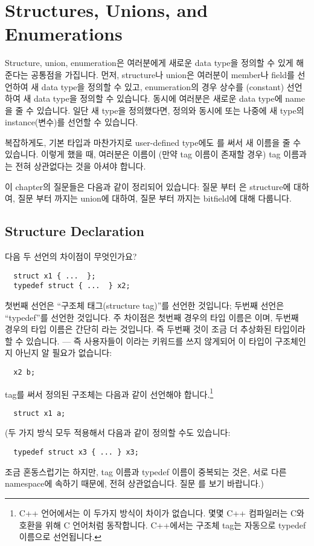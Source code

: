 \chapter{Structures, Unions, and Enumerations}	\label{chap:struct}

Structure, union, enumeration은 여러분에게 새로운 data type을 정의할 수
있게 해준다는 공통점을 가집니다.  먼저, structure나 union은 여러분이
member나 field를 선언하여 새 data type을 정의할 수 있고, enumeration의 경우
상수를 (constant) 선언하여 새 data type을 정의할 수 있습니다.
동시에 여러분은 새로운 data type에  name을 줄 수 있습니다.
일단 새 type을 정의했다면, 정의와 동시에 또는 나중에 새 type의 
instance(변수)를 선언할 수 있습니다.

복잡하게도, 기본 타입과 마찬가지로 user-defined type에도 를
써서 새 이름을 줄 수 있습니다. 이렇게 했을 때, 여러분은  이름이
(만약 tag 이름이 존재할 경우) tag 이름과는 전혀 상관없다는 것을 아셔야 
합니다.

이 chapter의 질문들은 다음과 같이 정리되어 있습니다:  
질문 부터 은
structure에 대하여, 질문 부터 까지는 union에 대하여,
질문 부터 까지는 bitfield에 대해 다룹니다.

\section{Structure Declaration}

\begin{faq}
	다음 두 선언의 차이점이 무엇인가요?

\begin{verbatim}
  struct x1 { ...  };
  typedef struct { ...  } x2;
\end{verbatim}

\A
	첫번째 선언은 ``구조체 태그(structure tag)''를 선언한 것입니다; 두번째 선언은
	``typedef''를 선언한 것입니다.  주 차이점은 첫번째 경우의 타입 이름은
	이며, 두번째 경우의 타입 이름은 간단히 라는
	것입니다.  즉 두번째 것이 조금 더 추상화된 타입이라 할 수 있습니다.
	--- 즉 사용자들이 이라는 키워드를 쓰지 않게되어 이 타입이
	구조체인지 아닌지 알 필요가 없습니다:
\begin{verbatim}
  x2 b;
\end{verbatim}
        tag를 써서 정의된 구조체는 다음과 같이 선언해야 합니다.\footnote{C++ 언어에서는
        이 두가지 방식이 차이가 없습니다. 몇몇 C++ 컴파일러는 C와 호환을 위해
        C 언어처럼 동작합니다. C++에서는 구조체 tag는 자동으로 typedef 이름으로
        선언됩니다.}
\begin{verbatim}
  struct x1 a;
\end{verbatim}
        (두 가지 방식 모두 적용해서 다음과 같이 정의할 수도 있습니다:
\begin{verbatim}
  typedef struct x3 { ... } x3;
\end{verbatim}
        조금 혼동스럽기는 하지만, tag 이름과 typedef 이름이 중복되는 것은,
        서로 다른 namespace에 속하기 때문에, 전혀 상관없습니다.
        질문 를 보기 바랍니다.)

\end{faq}

